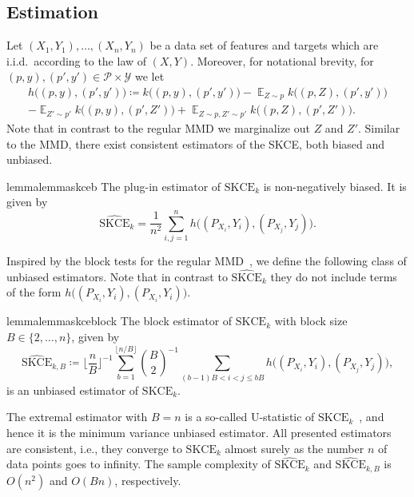 \documentclass{article}
\DeclareMathOperator{\Exp}{\mathbb{E}}
\begin{document}
\subsection{Estimation}

Let $(X_1, Y_1), \ldots, (X_n, Y_n)$ be a data set of features and targets which are i.i.d.\
according to the law of $(X, Y)$. Moreover, for notational brevity, for
$(p, y), (p', y') \in \mathcal{P} \times \mathcal{Y}$ we let
\begin{multline*}
    h\big((p, y), (p', y')\big) \coloneqq k\big((p, y), (p', y')\big) - \Exp_{Z \sim p} k\big((p, Z), (p', y')\big) \\
    - \Exp_{Z' \sim p'} k\big((p, y), (p', Z')\big) + \Exp_{Z \sim p, Z' \sim p'} k\big((p, Z), (p', Z')\big).
\end{multline*}
Note that in contrast to the regular MMD we marginalize out $Z$ and $Z'$. Similar to the MMD, there exist
consistent estimators of the SKCE, both biased and unbiased.

\begin{restatable}{lemma}{lemmaskceb}\label{lemma:skceb}
The plug-in estimator of $\mathrm{SKCE}_k$ is non-negatively biased. It is given by
\begin{equation*}
    \widehat{\mathrm{SKCE}}_k =
    \frac{1}{n^2} \sum_{i,j=1}^n h\big((P_{X_i}, Y_i), (P_{X_j}, Y_j)\big).
\end{equation*}
\end{restatable}

Inspired by the block tests for the regular MMD~\citep{Zaremba2013}, we define the
following class of unbiased estimators. Note that in contrast to $\widehat{\mathrm{SKCE}}_k$
they do not include terms of the form $h\big((P_{X_i}, Y_i), (P_{X_i}, Y_i)\big)$.

\begin{restatable}{lemma}{lemmaskceblock}\label{lemma:skceblock}
The block estimator of $\mathrm{SKCE}_k$ with
block size $B \in \{2,\ldots,n\}$, given by
\begin{equation*}
    \widehat{\mathrm{SKCE}}_{k,B} \coloneqq \bigg\lfloor \frac{n}{B} \bigg\rfloor^{-1} \sum_{b=1}^{\lfloor n / B \rfloor} \binom{B}{2}^{-1} \sum_{(b - 1) B < i < j \leq bB} h\big((P_{X_{i}}, Y_i), (P_{X_j}, Y_j)\big),
\end{equation*}
is an unbiased estimator of $\mathrm{SKCE}_k$.
\end{restatable}

The extremal estimator with $B = n$ is a so-called U-statistic of
$\mathrm{SKCE}_k$~\citep{Hoeffding1948,Vaart1998}, and hence it is
the minimum variance unbiased estimator. All presented estimators are
consistent, i.e., they converge to $\mathrm{SKCE}_k$ almost surely as
the number $n$ of data points goes to infinity. The sample complexity
of $\widehat{\mathrm{SKCE}}_k$ and $\widehat{\mathrm{SKCE}}_{k,B}$ is
$O(n^2)$ and $O(Bn)$, respectively.
\end{document}
